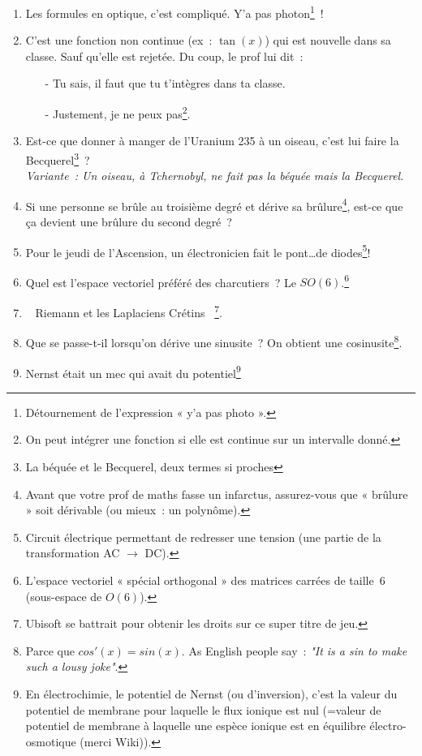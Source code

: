 \documentclass[10pt,a5paper,fullpage]{book}
\begin{document}
\begin{enumerate}
		\item Les formules en optique, c’est compliqué. Y’a pas photon\footnote{Détournement de l’expression « y’a pas photo ».}~!
		\item C’est une fonction non continue (ex~: $\tan(x)$) qui est nouvelle dans sa classe. Sauf qu’elle est rejetée. Du coup, le prof lui dit~: 
		\begin{itemize}
			\item[-] Tu sais, il faut que tu t’intègres dans ta classe.
			\item[-] Justement, je ne peux pas\footnote{On peut intégrer une fonction si elle est continue sur un intervalle donné.}.
		\end{itemize}
		\item Est-ce que donner à manger de l’Uranium 235 à un oiseau, c’est lui faire la Becquerel\footnote{La béquée et le Becquerel, deux termes si proches}~? \\\textit{Variante~: Un oiseau, à Tchernobyl, ne fait pas la béquée mais la Becquerel}.
		\item Si une personne se brûle au troisième degré et dérive sa brûlure\footnote{Avant que votre prof de maths fasse un infarctus, assurez-vous que « brûlure » soit dérivable (ou mieux~: un polynôme).}, est-ce que ça devient une brûlure du second degré~?
		\item  Pour le jeudi de l’Ascension, un électronicien fait le pont\ldots de diodes\footnote{Circuit électrique permettant de redresser une tension (une partie de la transformation AC $\rightarrow$ DC).}!
		\item Quel est l’espace vectoriel préféré des charcutiers~? Le $SO(6)$.\footnote{L’espace vectoriel « spécial orthogonal » des matrices carrées de taille~6 (sous-espace de $O(6)$).}
		\item \guillemotleft~ Riemann et les Laplaciens Crétins ~\guillemotright\footnote{Ubisoft se battrait pour obtenir les droits sur ce super titre de jeu.}.
		\item Que se passe-t-il lorsqu’on dérive une sinusite~? On obtient une cosinusite\footnote{Parce que $cos'(x) = sin(x)$. As English people say~: \textit{"It is a sin to make such a lousy joke"}.}.
		\item Nernst était un mec qui avait du potentiel\footnote{En électrochimie, le potentiel de Nernst (ou d'inversion), c'est la valeur du potentiel de membrane pour laquelle le flux ionique est nul (=valeur de potentiel de membrane à laquelle une espèce ionique est en équilibre électro-osmotique (merci Wiki)).}

\end{enumerate}
\end{document}
